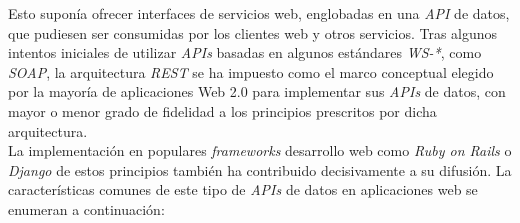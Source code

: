 Esto supon\'ia ofrecer interfaces de servicios web, englobadas en una \textit{API} de datos, que pudiesen ser consumidas por los clientes web y otros servicios. Tras algunos intentos iniciales de utilizar \textit{APIs} basadas en algunos est\'andares \textit{WS-*}, como \textit{SOAP}, la arquitectura \textit{REST} se ha impuesto como el marco conceptual elegido por la mayor\'ia de aplicaciones Web 2.0 para implementar sus \textit{APIs} de datos, con mayor o menor grado de fidelidad a los principios prescritos por dicha arquitectura.\\
La  implementaci\'on en populares \textit{frameworks} desarrollo web como \textit{Ruby on Rails} o \textit{Django} de estos principios tambi\'en ha contribuido decisivamente a su difusi\'on.
La caracter\'isticas comunes de este tipo de \textit{APIs} de datos en aplicaciones web se enumeran a continuaci\'on:

